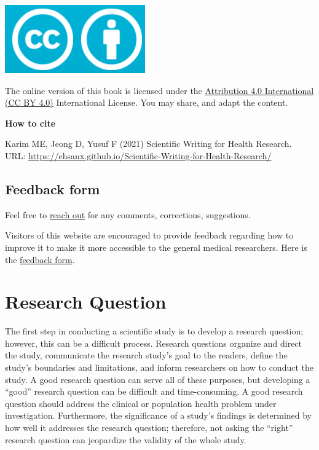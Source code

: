 \documentclass[
]{book}
\begin{document}
\includegraphics[width=0.25\linewidth]{images/by}

The online version of this book is licensed under the \href{https://creativecommons.org/licenses/by/4.0/}{Attribution 4.0 International (CC BY 4.0)} International License. You may share, and adapt the content.

\begin{rmdcomment}
\textbf{How to cite}

Karim ME, Jeong D, Yusuf F (2021) Scientific Writing for Health
Research. URL:
\url{https://ehsanx.github.io/Scientific-Writing-for-Health-Research/}
\end{rmdcomment}

\hypertarget{feedback-form}{%
\section*{Feedback form}\label{feedback-form}}

Feel free to \href{https://ehsank.com/}{reach out} for any comments, corrections, suggestions.

Visitors of this website are encouraged to provide feedback regarding how to improve it to make it more accessible to the general medical researchers. Here is the \href{https://forms.gle/tzJ3YYP7P4edtgnW9}{feedback form}.

\hypertarget{research-question}{%
\chapter{Research Question}\label{research-question}}

The first step in conducting a scientific study is to develop a research question; however, this can be a difficult process. Research questions organize and direct the study, communicate the research study's goal to the readers, define the study's boundaries and limitations, and inform researchers on how to conduct the study. A good research question can serve all of these purposes, but developing a ``good'' research question can be difficult and time-consuming. A good research question should address the clinical or population health problem under investigation. Furthermore, the significance of a study's findings is determined by how well it addresses the research question; therefore, not asking the ``right'' research question can jeopardize the validity of the whole study.
\end{document}
